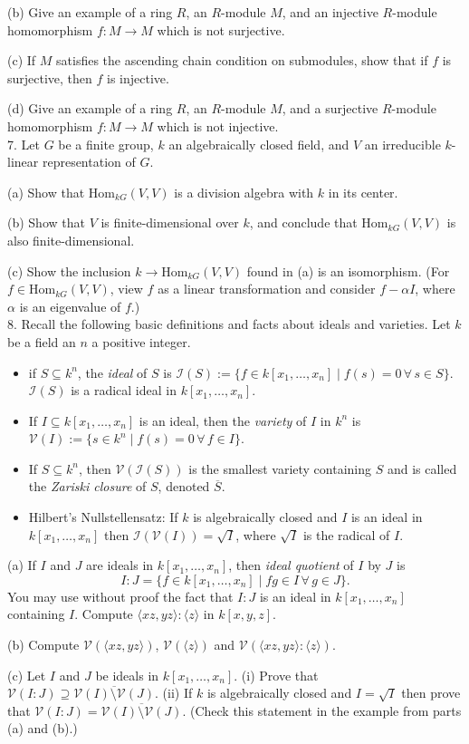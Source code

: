 \documentclass[11pt]{article}
\begin{document}
(b) Give an example of a ring $R$, an $R$-module $M$, and an injective $R$-module
homomorphism $f : M \to M$ which is not surjective.

(c) If $M$ satisfies the ascending chain condition on submodules, show that if
$f$ is surjective, then $f$ is injective.

(d) Give an example of a ring $R$, an $R$-module $M$, and a surjective $R$-module
homomorphism $f : M \to M$ 	which is not injective.\\


7. Let $G$ be a finite group, $k$ an algebraically closed field, and $V$ an irreducible
$k$-linear representation of $G$.

(a) Show that $\mbox{Hom}_{kG}(V,V)$ is a division algebra with $k$ in its center. 

(b) Show that $V$ is finite-dimensional over $k$, and conclude that  $\mbox{Hom}_{kG}(V,V)$ is also finite-dimensional.

(c) Show the inclusion $k\to \mbox{Hom}_{kG}(V,V)$ found in (a) is an isomorphism. (For $f\in \mbox{Hom}_{kG}(V,V)$, view $f$ as a linear transformation and consider $f-\alpha I$, where $\alpha$ is an eigenvalue of $f$.)\\

8. Recall the following basic definitions and facts about ideals and varieties. Let $k$ be a field an $n$ a positive integer.
\begin{itemize}
\item if $S\subseteq k^n$, the \emph{ideal} of $S$ is $\mathcal I(S) := \{f\in k[x_1,\ldots, x_n]\mid f(s) = 0\, \forall \, s\in S\}$. $\mathcal I(S)$ is a radical ideal in $k[x_1,\ldots, x_n]$. 
\item If $I\subseteq k[x_1,\ldots, x_n]$ is an ideal, then the \emph{variety} of $I$ in $k^n$ is $\mathcal V(I) :=\{s\in k^n \mid f(s) = 0\, \forall \, f\in I\}$. 
\item If $S\subseteq k^n$, then $\mathcal V(\mathcal I(S))$ is the smallest variety containing $S$ and is called the \emph{Zariski closure} of $S$, denoted $\overline{S}$. 
\item Hilbert's Nullstellensatz: If $k$ is algebraically closed and $I$ is an ideal in $k[x_1,\ldots, x_n]$ then $\mathcal I (\mathcal V(I)) = \sqrt{I}$, where $\sqrt{I}$ is the radical of $I$.
\end{itemize}
(a) If $I$ and $J$ are ideals in $k[x_1,\ldots, x_n]$, then \emph{ideal quotient} of $I$ by $J$ is \[
I:J = \{f\in k[x_1,\ldots, x_n]\mid fg \in I\, \forall \, g\in J\}.
\]
You may use without proof the fact that $I:J$ is an ideal in $k[x_1,\ldots, x_n]$ containing $I$. Compute $\langle xz,yz\rangle :\langle z\rangle$ in $k[x,y,z]$. 

(b) Compute $\mathcal V(\langle xz, yz\rangle)$, $\mathcal V(\langle z\rangle)$ and $\mathcal V(\langle xz,yz\rangle :\langle z\rangle)$. 


(c) Let $I$ and $J$ be ideals in $k[x_1,\ldots, x_n]$. (i) Prove that $\mathcal V(I:J) \supseteq \overline{\mathcal V(I)\setminus \mathcal V(J)}$. (ii) If $k$ is algebraically closed and $I=\sqrt{I}$ then prove that $\mathcal V(I:J) = \overline{\mathcal V(I)\setminus \mathcal V(J)}$.  (Check this statement in the example from parts (a) and
(b).)
\end{document}
